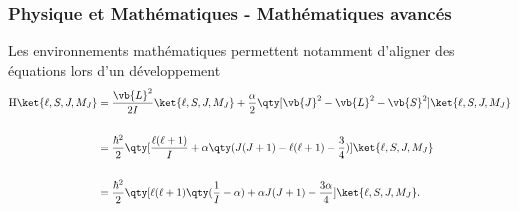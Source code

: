 \begin{frame}
  \frametitle{Physique et Mathématiques - Mathématiques avancés}
  Les environnements mathématiques permettent notamment d'aligner des équations lors d'un développement
    \begin{align*}
        \mathrm{H}\ket{\ell, S, J, M_J} &= \frac{\vb{L}^2}{2I}\ket{\ell, S, J, M_J} + \frac{\alpha}{2}\qty[\vb{J}^2 - \vb{L}^2 - \vb{S}^2]\ket{\ell, S, J, M_J} \\\\
        &= \frac{\hbar^2}{2}\qty[\frac{\ell(\ell + 1)}{I} + \alpha\qty(J(J + 1) - \ell(\ell + 1) - \frac{3}{4})]\ket{\ell, S, J, M_J} \\\\
        &= \frac{\hbar^2}{2}\qty[\ell(\ell + 1)\qty(\frac{1}{I} - \alpha) + \alpha J(J + 1) - \frac{3\alpha}{4}]\ket{\ell, S, J, M_J}.
    \end{align*}
\end{frame}
